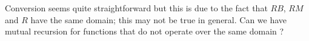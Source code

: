 \documentclass[10pt]{article}
\begin{document}
Conversion seems quite straightforward but this is due to the fact that $RB$, $RM$ and $R$ have the same domain; this may not be true in general. Can we have mutual recursion for functions that do not operate over the same domain ?

\end{document}
